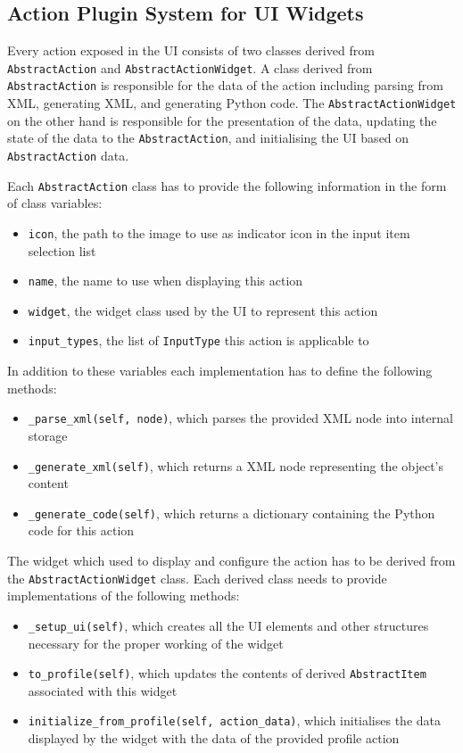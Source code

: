 \documentclass[a4, 10pt]{article}
\begin{document}
\subsection{Action Plugin System for UI Widgets}

Every action exposed in the UI consists of two classes derived from
\texttt{Abstract\allowbreak Action} and \texttt{AbstractActionWidget}. A
class derived from \texttt{AbstractAction} is responsible for the data
of the action including parsing from XML, generating XML, and generating
Python code.  The \texttt{AbstractActionWidget} on the other hand is
responsible for the presentation of the data, updating the state of the
data to the \texttt{AbstractAction}, and initialising the UI based on
\texttt{AbstractAction} data.

Each \verb+AbstractAction+ class has to provide the following information
in the form of class variables:
\begin{itemize}
    \item \verb+icon+, the path to the image to use as indicator icon in
        the input item selection list
    \item \verb+name+, the name to use when displaying this action
    \item \verb+widget+, the widget class used by the UI to represent
        this action
    \item \verb+input_types+, the list of \verb+InputType+ this action
        is applicable to
\end{itemize}
In addition to these variables each implementation has to define the
following methods:
\begin{itemize}
    \item \verb+_parse_xml(self, node)+, which parses the provided XML
        node into internal storage
    \item \verb+_generate_xml(self)+, which returns a XML node
        representing the object's content
    \item \verb+_generate_code(self)+, which returns a dictionary
        containing the Python code for this action
\end{itemize}

The widget which used to display and configure the action has to
be derived from the \verb+AbstractActionWidget+ class. Each derived
class needs to provide implementations of the following methods:
\begin{itemize}
    \item \verb+_setup_ui(self)+, which creates all the UI elements and
        other structures necessary for the proper working of the widget
    \item \verb+to_profile(self)+, which updates the contents of derived
        \verb+AbstractItem+ associated with this widget
    \item \verb+initialize_from_profile(self, action_data)+, which
        initialises the data displayed by the widget with the data of
        the provided profile action
\end{itemize}
\end{document}
